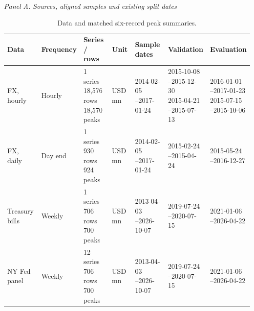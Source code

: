 \begin{table}[!htbp]
\centering
\caption{Data and matched six-record peak summaries.}\label{tab:v12-data}
\begingroup\scriptsize\setlength{\tabcolsep}{2.5pt}
\textit{Panel A. Sources, aligned samples and existing split dates}\\[3pt]
\begin{tabular}{@{}p{.13\linewidth}p{.08\linewidth}p{.11\linewidth}p{.08\linewidth}p{.15\linewidth}p{.16\linewidth}p{.16\linewidth}@{}}
\toprule
Data & Frequency & Series / rows & Unit & Sample dates & Validation & Evaluation \\
\midrule
FX, hourly & Hourly & \shortstack[l]{1 series\\18,576 rows\\18,570 peaks} & USD mn & \shortstack[l]{2014-02-05\\--2017-01-24} & \shortstack[l]{2015-10-08\\--2015-12-30\\2015-04-21\\--2015-07-13} & \shortstack[l]{2016-01-01\\--2017-01-23\\2015-07-15\\--2015-10-06} \\
FX, daily & Day end & \shortstack[l]{1 series\\930 rows\\924 peaks} & USD mn & \shortstack[l]{2014-02-05\\--2017-01-24} & \shortstack[l]{2015-02-24\\--2015-04-24} & \shortstack[l]{2015-05-24\\--2016-12-27} \\
Treasury bills & Weekly & \shortstack[l]{1 series\\706 rows\\700 peaks} & USD mn & \shortstack[l]{2013-04-03\\--2026-10-07} & \shortstack[l]{2019-07-24\\--2020-07-15} & \shortstack[l]{2021-01-06\\--2026-04-22} \\
NY Fed panel & Weekly & \shortstack[l]{12 series\\706 rows\\700 peaks} & USD mn & \shortstack[l]{2013-04-03\\--2026-10-07} & \shortstack[l]{2019-07-24\\--2020-07-15} & \shortstack[l]{2021-01-06\\--2026-04-22} \\

\end{tabular}
\end{table}
